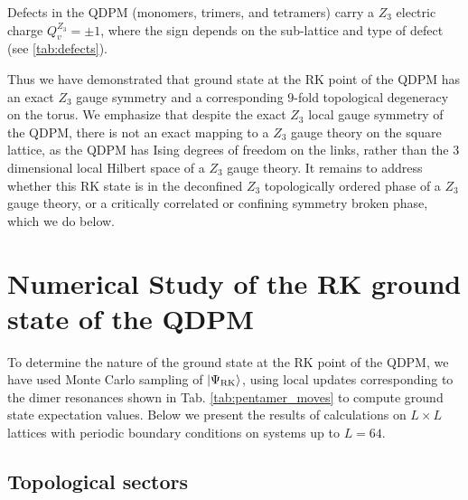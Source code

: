 \documentclass[twocolumn,prb,aps,floatfix,superscriptaddress]{revtex4-1}
\newcommand{\tabref}[1]{Tab. \ref{#1}}
\newcommand{\ket}[1]{| #1 \rangle}
\begin{document}
Defects in the QDPM (monomers, trimers, and tetramers) carry a $Z_3$ electric charge $Q_v^{Z_3} = \pm 1$, where the sign depends on the sub-lattice and type of defect (see \ref{tab:defects}).

Thus we have demonstrated that ground state at the RK point of the QDPM has an exact $Z_3$ gauge symmetry and a corresponding $9$-fold topological degeneracy on the torus. We emphasize that despite the exact $Z_3$ local gauge symmetry of the QDPM, there is not an exact mapping to a $Z_3$ gauge theory on the square lattice, as the QDPM has Ising degrees of freedom on the links, rather than the 3 dimensional local Hilbert space of a $Z_3$ gauge theory.  It remains to address whether this RK state is in the deconfined $Z_3$ topologically ordered phase of a $Z_3$ gauge theory, or a critically correlated or confining symmetry broken phase, which we do below.


\section{Numerical Study of the RK ground state of the QDPM}
\label{sec:numerics}

To determine the nature of the ground state at the RK point of the QDPM, we have used Monte Carlo sampling of $\ket{\Psi_{\rm{RK}}}$, using local updates corresponding to the dimer resonances shown in \tabref{tab:pentamer_moves} to compute ground state expectation values. Below we present the results of calculations on $L\times L$ lattices with periodic boundary conditions on systems up to $L=64$. 

\subsection{Topological sectors}
\end{document}
